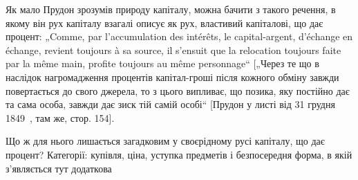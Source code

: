 Як мало Прудон зрозумів природу капіталу, можна бачити
з такого речення, в якому він рух капіталу взагалі описує як рух,
властивий капіталові, що дає процент: „Comme, par l’accumulation
des intérêts, le capital-argent, d’échange en échange, revient toujours
à sa source, il s’ensuit que la relocation toujours faite par la même
main, profite toujours au même personnage“ [„Через те що
в наслідок нагромадження процентів капітал-гроші після кожного
обміну завжди повертається до свого джерела, то з цього випливає,
що позика, яку постійно дає та сама особа, завжди дає зиск
тій самій особі“ [Прудон у листі від 31 грудня 1849~, там же,
стор. 154].

Що ж для нього лишається загадковим у своєрідному русі
капіталу, що дає процент? Категорії: купівля, ціна, уступка предметів
і безпосередня форма, в якій з’являється тут додаткова
\parbreak{}  %
